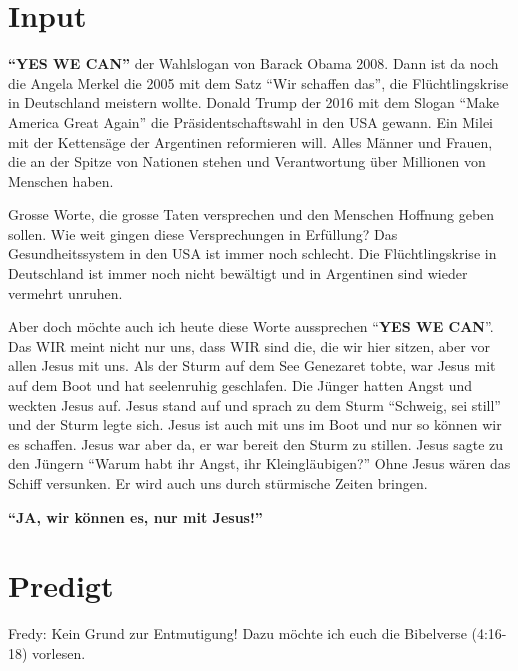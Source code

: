 \documentclass{../../inc/mybib}
\newenvironment{block}[1][]{%
  \vspace{1.5em}%
  \noindent\textbf{#1}\par%
  \vspace{0.0em}%
}{%
  \vspace{1em}%
}
\begin{document}
\section{ Input }
\begin{spacing}{1.5}    
   \textbf{\enquote{YES WE CAN}} der Wahlslogan von Barack Obama 2008. Dann ist da noch die Angela Merkel die 2005 mit dem Satz \enquote{Wir schaffen das}, die Flüchtlingskrise in Deutschland meistern wollte. Donald Trump der 2016 mit dem Slogan \enquote{Make America Great Again} die Präsidentschaftswahl in den USA gewann. Ein Milei mit der Kettensäge der Argentinen reformieren will. Alles Männer und Frauen, die an der Spitze von Nationen stehen und Verantwortung über Millionen von Menschen haben.
    \begin{block}
    Grosse Worte, die grosse Taten versprechen und den Menschen Hoffnung geben sollen. Wie weit gingen diese Versprechungen in Erfüllung? Das Gesundheitssystem in den USA ist immer noch schlecht. Die Flüchtlingskrise in Deutschland ist immer noch nicht bewältigt und in Argentinen sind wieder vermehrt unruhen.
    \end{block}
    \begin{block}
    Aber doch möchte auch ich heute diese Worte aussprechen \enquote{\textbf{YES WE CAN}}. Das WIR meint nicht nur uns, dass WIR sind die, die wir hier sitzen, aber vor allen Jesus mit uns. 
    \end{block}
    Als der Sturm auf dem See Genezaret tobte, war Jesus mit auf dem Boot und hat seelenruhig geschlafen. Die Jünger hatten Angst und weckten Jesus auf. Jesus stand auf und sprach zu dem Sturm \enquote{Schweig, sei still} und der Sturm legte sich. Jesus ist auch mit uns im Boot und nur so können wir es schaffen. Jesus war aber da, er war bereit den Sturm zu stillen. Jesus sagte zu den Jüngern \enquote{Warum habt ihr Angst, ihr Kleingläubigen?} Ohne Jesus wären das Schiff versunken. Er wird auch uns durch stürmische Zeiten bringen.

    \textbf{\enquote{JA, wir können es, nur mit Jesus!}}

\end{spacing}

\section{Predigt}

Fredy: Kein Grund zur Entmutigung!
Dazu möchte ich euch die Bibelverse (4:16-18) vorlesen.
\end{document}
